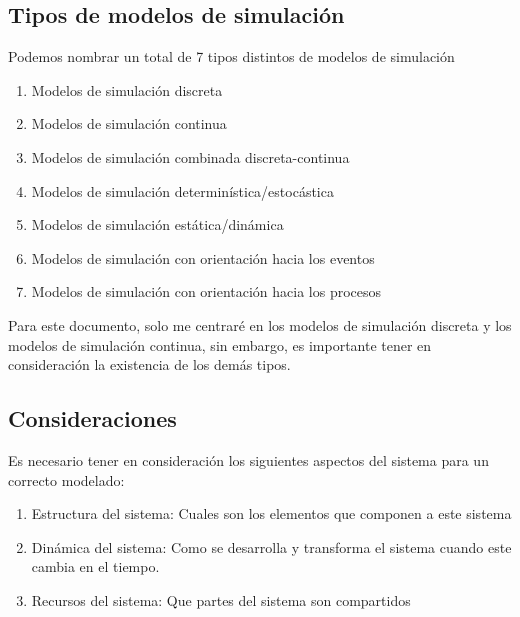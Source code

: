 \subsection*{Tipos de modelos de simulación}
Podemos nombrar un total de 7 tipos distintos de modelos de simulación

\begin{enumerate}
    \item Modelos de simulación discreta
    \item Modelos de simulación continua
    \item Modelos de simulación combinada discreta-continua
    \item Modelos de simulación determinística/estocástica
    \item Modelos de simulación estática/dinámica
    \item Modelos de simulación con orientación hacia los eventos
    \item Modelos de simulación con orientación hacia los procesos
\end{enumerate}

Para este documento, solo me centraré en los modelos de simulación discreta y los modelos de simulación continua, sin embargo, es importante tener en consideración la existencia de los demás tipos.

\subsection*{Consideraciones}
Es necesario tener en consideración los siguientes aspectos del sistema para un correcto modelado:

\begin{enumerate}
    \item Estructura del sistema: Cuales son los elementos que componen a este sistema
    \item Dinámica del sistema: Como se desarrolla y transforma el sistema cuando este cambia en el tiempo.
    \item Recursos del sistema: Que partes del sistema son compartidos
\end{enumerate}